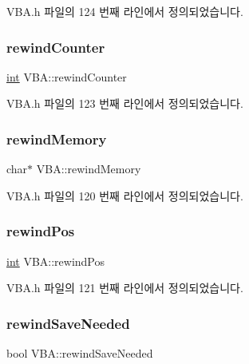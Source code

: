 V\+B\+A.\+h 파일의 124 번째 라인에서 정의되었습니다.

\mbox{\label{class_v_b_a_a63a3cf03d4213b2596b59226134b0d5b}} 
\subsubsection{\texorpdfstring{rewind\+Counter}{rewindCounter}}
{\footnotesize\ttfamily \mbox{\hyperlink{_util_8cpp_a0ef32aa8672df19503a49fab2d0c8071}{int}} V\+B\+A\+::rewind\+Counter}



V\+B\+A.\+h 파일의 123 번째 라인에서 정의되었습니다.

\mbox{\label{class_v_b_a_ad2f4e21586cc185a1e6525080532471a}} 
\subsubsection{\texorpdfstring{rewind\+Memory}{rewindMemory}}
{\footnotesize\ttfamily char$\ast$ V\+B\+A\+::rewind\+Memory}



V\+B\+A.\+h 파일의 120 번째 라인에서 정의되었습니다.

\mbox{\label{class_v_b_a_a5d8ea18c98b5188813210a84819da5e8}} 
\subsubsection{\texorpdfstring{rewind\+Pos}{rewindPos}}
{\footnotesize\ttfamily \mbox{\hyperlink{_util_8cpp_a0ef32aa8672df19503a49fab2d0c8071}{int}} V\+B\+A\+::rewind\+Pos}



V\+B\+A.\+h 파일의 121 번째 라인에서 정의되었습니다.

\mbox{\label{class_v_b_a_a3f8cd6f6705f0306f57818e885a50aa3}} 
\subsubsection{\texorpdfstring{rewind\+Save\+Needed}{rewindSaveNeeded}}
{\footnotesize\ttfamily bool V\+B\+A\+::rewind\+Save\+Needed}



